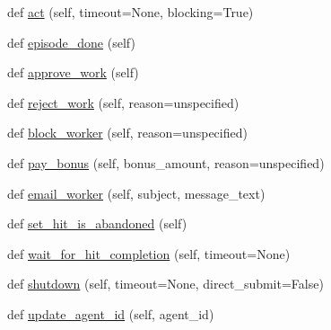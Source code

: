 \begin{DoxyCompactItemize}
\item 
def \hyperlink{classparlai_1_1mturk_1_1webapp_1_1run__mocks_1_1mock__turk__agent_1_1MockTurkAgent_a102d5896e39d6f1262a7306241d76f49}{act} (self, timeout=None, blocking=True)
\item 
def \hyperlink{classparlai_1_1mturk_1_1webapp_1_1run__mocks_1_1mock__turk__agent_1_1MockTurkAgent_a67dd7773ade58384298eb60b2621350b}{episode\+\_\+done} (self)
\item 
def \hyperlink{classparlai_1_1mturk_1_1webapp_1_1run__mocks_1_1mock__turk__agent_1_1MockTurkAgent_ae57ab3c911012c54e0868a4a37e6b199}{approve\+\_\+work} (self)
\item 
def \hyperlink{classparlai_1_1mturk_1_1webapp_1_1run__mocks_1_1mock__turk__agent_1_1MockTurkAgent_a00eb96454a9ff0c5047ad925fd687c06}{reject\+\_\+work} (self, reason=\textquotesingle{}unspecified\textquotesingle{})
\item 
def \hyperlink{classparlai_1_1mturk_1_1webapp_1_1run__mocks_1_1mock__turk__agent_1_1MockTurkAgent_a7fd49124649a5a2e5df2d84f11dddf52}{block\+\_\+worker} (self, reason=\textquotesingle{}unspecified\textquotesingle{})
\item 
def \hyperlink{classparlai_1_1mturk_1_1webapp_1_1run__mocks_1_1mock__turk__agent_1_1MockTurkAgent_a3cf64911117b90e73008761d098540b7}{pay\+\_\+bonus} (self, bonus\+\_\+amount, reason=\textquotesingle{}unspecified\textquotesingle{})
\item 
def \hyperlink{classparlai_1_1mturk_1_1webapp_1_1run__mocks_1_1mock__turk__agent_1_1MockTurkAgent_a314cd0503084a1f6f176053ad390d672}{email\+\_\+worker} (self, subject, message\+\_\+text)
\item 
def \hyperlink{classparlai_1_1mturk_1_1webapp_1_1run__mocks_1_1mock__turk__agent_1_1MockTurkAgent_a4b5b9e7275db36ca8218b1f598eaa4e1}{set\+\_\+hit\+\_\+is\+\_\+abandoned} (self)
\item 
def \hyperlink{classparlai_1_1mturk_1_1webapp_1_1run__mocks_1_1mock__turk__agent_1_1MockTurkAgent_afdb671992bd015c5dac40dd5a0ae828b}{wait\+\_\+for\+\_\+hit\+\_\+completion} (self, timeout=None)
\item 
def \hyperlink{classparlai_1_1mturk_1_1webapp_1_1run__mocks_1_1mock__turk__agent_1_1MockTurkAgent_a15babe4006c68790a86ea0ff820e7a60}{shutdown} (self, timeout=None, direct\+\_\+submit=False)
\item 
def \hyperlink{classparlai_1_1mturk_1_1webapp_1_1run__mocks_1_1mock__turk__agent_1_1MockTurkAgent_ae3c269891151fee4d6bc27804d8be047}{update\+\_\+agent\+\_\+id} (self, agent\+\_\+id)
\end{DoxyCompactItemize}
